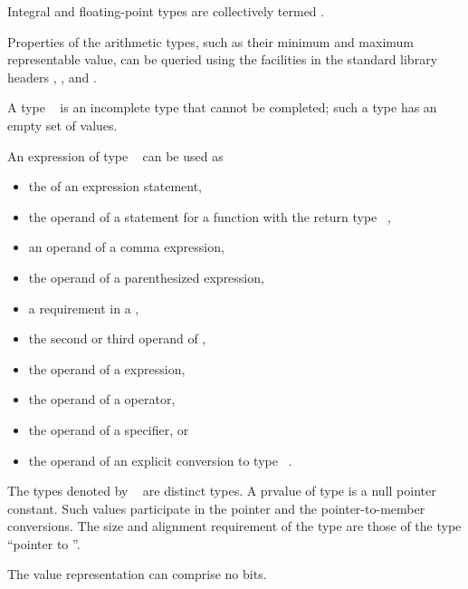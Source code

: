 \pnum
Integral and floating-point types are collectively
termed .
\begin{note}
Properties of the arithmetic types,
such as their minimum and maximum representable value,
can be queried using the facilities in the standard library headers
,
, and
.
\end{note}

\pnum
{}%
A type \cv{}~
is an incomplete type that cannot be completed; such a type has
an empty set of values.
\begin{note}
An expression of type \cv{}~ can be used as
\begin{itemize}
\item the  of an expression statement,
\item the operand of a  statement
for a function with the return type \cv{}~,
\item an operand of a comma expression,
\item the operand of a parenthesized expression,
\item a requirement in a ,
\item the second or third operand of ,
\item the operand of a  expression,
\item the operand of a  operator,
\item the operand of a  specifier, or
\item the operand of an explicit conversion to type
\cv{}~.
\end{itemize}
\end{note}

\pnum
The types denoted by \cv~ are distinct types.
A prvalue of type  is a null pointer
constant. Such values participate in the pointer and the
pointer-to-member conversions.
The size and alignment requirement of
the type  are those of
the type ``pointer to ''.
\begin{note}
The value representation can comprise no bits.
\end{note}


